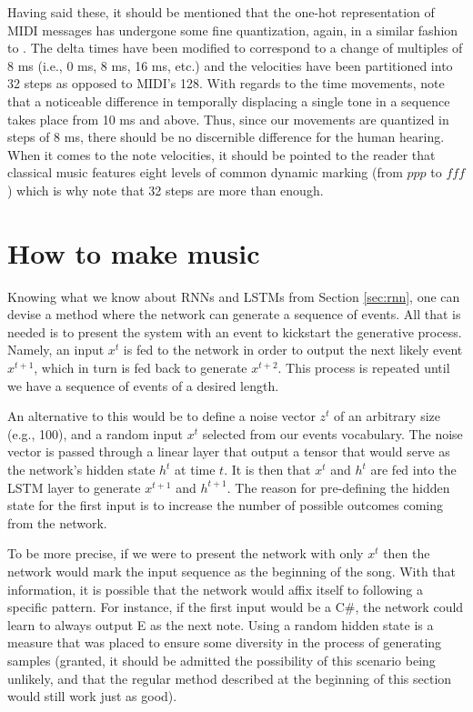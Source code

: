 \documentclass[a4paper]{book}
\begin{document}
Having said these, it should be mentioned that the one-hot representation of MIDI messages has undergone some fine quantization, again, in a similar fashion to \textcite{oore_this_2018}. The delta times have been modified to correspond to a change of multiples of 8 ms (i.e., 0 ms, 8 ms, 16 ms, etc.) and the velocities have been partitioned into 32 steps as opposed to MIDI's 128. With regards to the time movements, \textcite{friberg_overview_2006} note that a noticeable difference in temporally displacing a single tone in a sequence takes place from 10 ms and above. Thus, since our movements are quantized in steps of 8 ms, there should be no discernible difference for the human hearing. When it comes to the note velocities, it should be pointed to the reader that classical music features eight levels of common dynamic marking (from $ppp$ to $fff$) which is why \textcite{oore_this_2018} note that 32 steps are more than enough.

\section{How to make music} \label{sec:how_to_gen}

Knowing what we know about RNNs and LSTMs from Section \ref{sec:rnn}, one can devise a method where the network can generate a sequence of events. All that is needed is to present the system with an event to kickstart the generative process. Namely, an input $x^t$ is fed to the network in order to output the next likely event $x^{t+1}$, which in turn is fed back to generate $x^{t+2}$. This process is repeated until we have a sequence of events of a desired length.

An alternative to this would be to define a noise vector $z^t$ of an arbitrary size (e.g., 100), and a random input $x^t$ selected from our events vocabulary. The noise vector is passed through a linear layer that output a tensor that would serve as the network's hidden state $h^{t}$ at time $t$. It is then that $x^t$ and $h^{t}$ are fed into the LSTM layer to generate $x^{t+1}$ and $h^{t+1}$. The reason for pre-defining the hidden state for the first input is to increase the number of possible outcomes coming from the network.

To be more precise, if we were to present the network with only $x^t$ then the network would mark the input sequence as the beginning of the song. With that information, it is possible that the network would affix itself to following a specific pattern. For instance, if the first input would be a C\#, the network could learn to always output E as the next note. Using a random hidden state is a measure that was placed to ensure some diversity in the process of generating samples (granted, it should be admitted the possibility of this scenario being unlikely, and that the regular method described at the beginning of this section would still work just as good).
\end{document}
